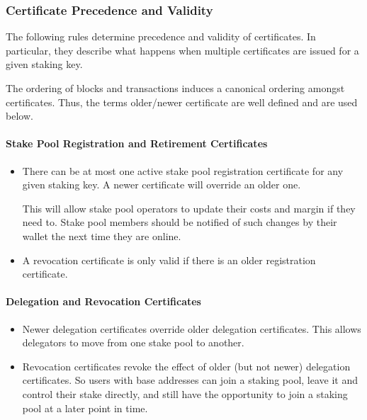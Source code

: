 \documentclass[11pt,a4paper]{article}
\begin{document}
\subsubsection{Certificate Precedence and Validity}
\label{certificate-precedence-and-validity}

The following rules determine precedence and validity of certificates.
In particular, they describe what happens when multiple certificates are
issued for a given staking key.

The ordering of blocks and transactions induces a canonical ordering
amongst certificates. Thus, the terms older/newer certificate are well
defined and are used below.

\paragraph{Stake Pool Registration and Retirement Certificates}
\label{stake-pool-registration-and-retirement-certificates}

\begin{itemize}
\item
  There can be at most one active stake pool registration certificate
  for any given staking key. A newer certificate will override an older
  one.

  This will allow stake pool operators to update their costs and margin
  if they need to. Stake pool members should be notified of such changes
  by their wallet the next time they are online.
\item
  A revocation certificate is only valid if there is an older
  registration certificate.
\end{itemize}

\paragraph{Delegation and Revocation Certificates}
\label{delegation-and-revocation-certificates}

\begin{itemize}
\item
  Newer delegation certificates override older delegation
  certificates. This allows delegators to move from one stake pool to
  another.
\item
  Revocation certificates revoke the effect of older (but not newer)
  delegation certificates. So users with base addresses can join a
  staking pool, leave it and control their stake directly, and still
  have the opportunity to join a staking pool at a later point in time.
\end{itemize}
\end{document}
